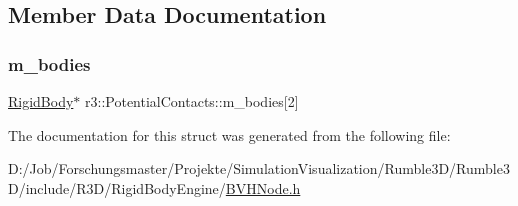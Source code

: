 \subsection{Member Data Documentation}
\mbox{\label{structr3_1_1_potential_contacts_abe9023b80e8adb82b9e2e0cb65527b3b}} 
\subsubsection{\texorpdfstring{m\+\_\+bodies}{m\_bodies}}
{\footnotesize\ttfamily \mbox{\hyperlink{classr3_1_1_rigid_body}{Rigid\+Body}}$\ast$ r3\+::\+Potential\+Contacts\+::m\+\_\+bodies\mbox{[}2\mbox{]}}



The documentation for this struct was generated from the following file\+:\begin{DoxyCompactItemize}
\item 
D\+:/\+Job/\+Forschungsmaster/\+Projekte/\+Simulation\+Visualization/\+Rumble3\+D/\+Rumble3\+D/include/\+R3\+D/\+Rigid\+Body\+Engine/\mbox{\hyperlink{_b_v_h_node_8h}{B\+V\+H\+Node.\+h}}\end{DoxyCompactItemize}
